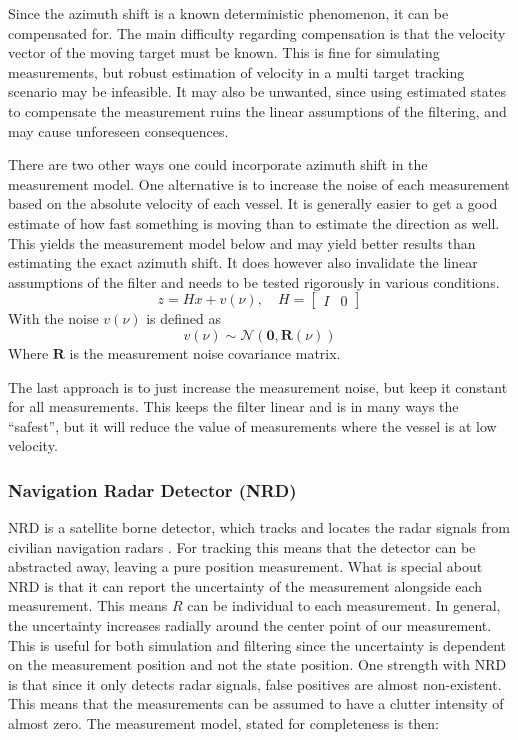 Since the azimuth shift is a known deterministic phenomenon, it can be compensated for. The main difficulty regarding compensation is that the velocity vector of the moving target must be known. This is fine for simulating measurements, but robust estimation of velocity in a multi target tracking scenario may be infeasible. It may also be unwanted, since using estimated states to compensate the measurement ruins the linear assumptions of the filtering, and may cause unforeseen consequences.
\medskip

There are two other ways one could incorporate azimuth shift in the measurement model. One alternative is to increase the noise of each measurement based on the absolute velocity of each vessel. It is generally easier to get a good estimate of how fast something is moving than to estimate the direction as well. This yields the measurement model below and may yield better results than estimating the exact azimuth shift. It does however also invalidate the linear assumptions of the filter and needs to be tested rigorously in various conditions.
\[
z = Hx + v(\nu), \quad H = \begin{bmatrix} I & 0 \end{bmatrix}
\]
With the noise $v(\nu)$ is defined as
\[
v(\nu) \sim \mathcal{N}(\mathbf{0}, \mathbf{R}(\nu))
\]
Where $\mathbf{R}$ is the measurement noise covariance matrix.
\medskip

The last approach is to just increase the measurement noise, but keep it constant for all measurements. This keeps the filter linear and is in many ways the ``safest'', but it will reduce the value of measurements where the vessel is at low velocity.

\subsubsection{Navigation Radar Detector (NRD)}
NRD is a satellite borne detector, which tracks and locates the radar signals from civilian navigation radars \cite{nrd_ffi}. For tracking this means that the detector can be abstracted away, leaving a pure position measurement. What is special about NRD is that it can report the uncertainty of the measurement alongside each measurement. This means $R$ can be individual to each measurement. In general, the uncertainty increases radially around the center point of our measurement. This is useful for both simulation and filtering since the uncertainty is dependent on the measurement position and not the state position. One strength with NRD is that since it only detects radar signals, false positives are almost non-existent. This means that the measurements can be assumed to have a clutter intensity of almost zero. The measurement model, stated for completeness is then:

